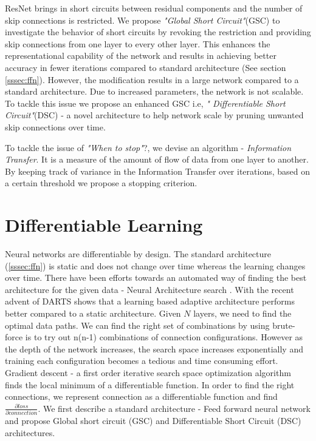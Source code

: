 \usepackage{}\documentclass{article}
\begin{document}
ResNet brings in short circuits between residual components and the number of skip connections is restricted. We propose \emph{"Global Short Circuit"}(GSC) to investigate the behavior of short circuits by revoking the restriction and providing skip connections from one layer to every other layer. This enhances the representational capability of the network and results in achieving better accuracy in fewer iterations compared to standard architecture (See section \ref{sssec:ffn}). However, the modification results in a large network compared to a standard architecture. Due to increased parameters, the network is not scalable. To tackle this issue we propose an enhanced GSC i.e, \emph{" Differentiable Short Circuit"}(DSC) - a novel architecture to help network scale by pruning unwanted skip connections over time.

To tackle the issue of \emph{"When to stop"}?, we devise an algorithm - \emph{Information Transfer}. It is a measure of the amount of flow of data from one layer to another. By keeping track of variance in the Information Transfer over iterations, based on a certain threshold we propose a stopping criterion.

\section{Differentiable Learning}
\label{sec:headings}

Neural networks are differentiable by design. The standard architecture (\ref{sssec:ffn}) is static and does not change over time whereas the learning changes over time. There have been efforts towards an automated way of finding the best architecture for the given data - Neural Architecture search \cite{Zoph2016NeuralAS}. With the recent advent of DARTS \cite{Liu2019DARTSDA} shows that a learning based adaptive architecture performs better compared to a static architecture. Given $N$ layers, we need to find the optimal data paths. We can find the right set of combinations by using brute-force is to try out n(n-1) combinations of connection configurations. However as the depth of the network increases, the search space increases exponentially and training each configuration becomes a tedious and time consuming effort. Gradient descent \cite{ruder2016overview} - a first order iterative search space optimization algorithm finds the local minimum of a differentiable function. In order to find the right connections, we represent connection as a differentiable function and find $\frac{\partial loss}{\partial connection}$. We first describe a standard architecture - Feed forward neural network and propose Global short circuit (GSC) and Differentiable Short Circuit (DSC) architectures.
\end{document}
